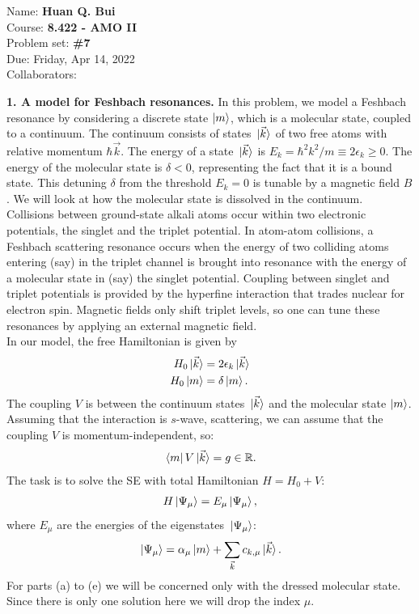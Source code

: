 \documentclass{article}
\theoremstyle{definition}
\newcommand{\al}{\alpha}
\begin{document}
\begin{framed}
\noindent Name: \textbf{Huan Q. Bui}\\
Course: \textbf{8.422 - AMO II}\\
Problem set: \textbf{\#7}\\
Due: Friday, Apr 14, 2022\\
Collaborators:  
\end{framed}
	


\noindent \textbf{1. A model for Feshbach resonances.} In this problem, we model a Feshbach resonance by considering a discrete state $\ket{m}$, which is a molecular state, coupled to a continuum. The continuum consists of states $\ket*{\vec{k}}$ of two free atoms with relative momentum $\hbar \vec{k}$. The energy of a state $\ket*{\vec{k}}$ is $E_k = \hbar^2 k^2 / m \equiv 2\epsilon_k \geq 0$. The energy of the molecular state is $\delta < 0$, representing the fact that it is a bound state. This detuning $\delta$ from the threshold $E_k = 0$ is tunable by a magnetic field $B$.  We will look at how the molecular state is dissolved in the continuum. \\

\noindent Collisions between ground-state alkali atoms occur within two electronic potentials, the singlet and the triplet potential. In atom-atom collisions, a Feshbach scattering resonance occurs when the energy of two colliding atoms entering (say) in the triplet channel is brought into resonance with the energy of a molecular state in (say) the singlet potential. Coupling between singlet and triplet potentials is provided by the hyperfine interaction that trades nuclear for electron spin. Magnetic fields only shift triplet levels, so one can tune these resonances by applying an external magnetic field. \\

In our model, the free Hamiltonian is given by 
\begin{align*}
H_0 \ket*{\vec{k}} &= 2 \epsilon_k \ket*{\vec{k}}  \\
H_0 \ket*{m} &= \delta \ket*{m}.
\end{align*}
The coupling $V$ is between the continuum states $\ket*{\vec{k}}$ and the molecular state $\ket{m}$. Assuming that the interaction is $s$-wave, scattering, we can assume that the coupling $V$ is momentum-independent, so:
\begin{align*}
\bra*{m} V \ket*{\vec{k}} = g \in \mathbb{R}. 
\end{align*}
The task is to solve the SE with total Hamiltonian $H = H_0 + V$:
\begin{align*}
H \ket*{\Psi_\mu} = E_\mu \ket*{\Psi_\mu},
\end{align*}
where $E_\mu$ are the energies of the eigenstates $\ket*{\Psi_\mu}$:
\begin{align*}
\ket*{\Psi_\mu} = \al_\mu \ket{m} + \sum_{\vec{k}} c_{{k}, \mu} \ket*{\vec{k}}. 
\end{align*}
For parts (a) to (e) we will be concerned only with the dressed molecular state. Since there is only one solution here we will drop the index $\mu$. 
\end{document}

